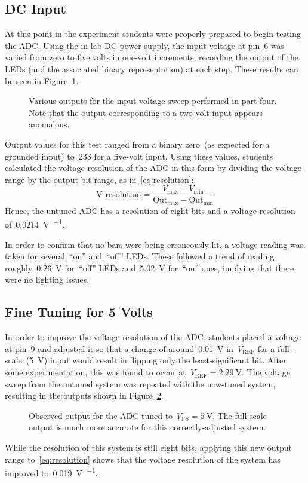 \subsection{DC Input}
At this point in the experiment students were properly prepared to begin testing the ADC.  Using the in-lab DC power supply, the input voltage at pin~6 was varied from zero to five volts in one-volt increments, recording the output of the LEDs (and the associated binary representation) at each step.  These results can be seen in Figure~\ref{fig:pt4bars}.
%
\begin{figure}[H]
	\centering
	
	\parbox{.6\textwidth}{
	\caption[LED output for untuned ADC]{Various outputs for the input voltage sweep performed in part four.  Note that the output corresponding to a two-volt input appears anomalous.}
	\label{fig:pt4bars}}
\end{figure}
%
Output values for this test ranged from a binary zero~(as expected for a grounded input) to~233 for a five-volt input.  Using these values, students calculated the voltage resolution of the ADC in this form by dividing the voltage range by the output bit range, as in~\eqref{eq:resolution}:
%
\begin{equation}
	\text{V resolution} = \frac{V_\text{max} - V_\text{min}}{\text{Out}_\text{max} - \text{Out}_\text{min}}
	\label{eq:resolution}
\end{equation}
%
Hence, the untuned ADC has a resolution of eight bits and a voltage resolution of~\SI{0.0214}{\volt\per\bit}.

In order to confirm that no bars were being erroneously lit, a voltage reading was taken for several~``on'' and~``off'' LEDs.  These followed a trend of reading roughly~\SI{0.26}{\volt} for~``off'' LEDs and~\SI{5.02}{\volt} for~``on'' ones, implying that there were no lighting issues.

\subsection{Fine Tuning for 5 Volts}
In order to improve the voltage resolution of the ADC, students placed a voltage at pin~9 and adjusted it so that a change of around~\SI{0.01}{\volt} in~$V_\text{REF}$ for a full-scale~(\SI{5}{\volt}) input would result in flipping only the least-significant bit.  After some experimentation, this was found to occur at~$V_\text{REF} = \SI{2.29}{\volt}$.  The voltage sweep from the untuned system was repeated with the now-tuned system, resulting in the outputs shown in Figure~\ref{fig:pt5bars}.
%
\begin{figure}[H]
	\centering
	
	\parbox{.6\textwidth}{
	\caption[LED output for tuned ADC; $V_\text{FS} = \SI{5}{\volt}$]{Observed output for the ADC tuned to~$V_\text{FS} = \SI{5}{\volt}$.  The full-scale output is much more accurate for this correctly-adjusted system.}
	\label{fig:pt5bars}}
\end{figure}
%
While the resolution of this system is still eight bits, applying this new output range to~\eqref{eq:resolution} shows that the voltage resolution of the system has improved to~\SI{0.019}{\volt\per\bit}.

